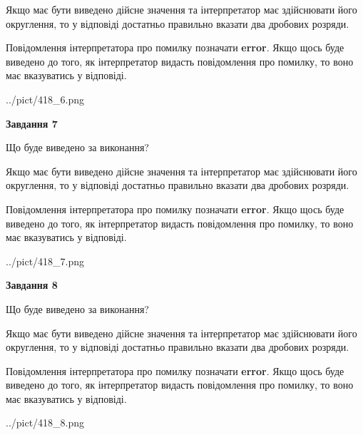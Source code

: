 \documentclass[12pt, ukrainian]{article}
\begin{document}
{\begin {Large}
Якщо має бути виведено дійсне значення та інтерпретатор має здійснювати його округлення, 
то у відповіді достатньо правильно вказати два дробових розряди.

Повідомлення інтерпретатора про помилку позначати \textbf{error}.
Якщо щось буде виведено до того, як інтерпретатор видасть повідомлення про помилку, 
то воно має вказуватись у відповіді. \par

\begin{center}
	{../pict/418_6.png}
\end{center}
\newpage

{\begin {center}\textbf{Завдання 7}\end {center}}\par
Що буде виведено за виконання? \par

Якщо має бути виведено дійсне значення та інтерпретатор має здійснювати його округлення, 
то у відповіді достатньо правильно вказати два дробових розряди.

Повідомлення інтерпретатора про помилку позначати \textbf{error}.
Якщо щось буде виведено до того, як інтерпретатор видасть повідомлення про помилку, 
то воно має вказуватись у відповіді. \par

\begin{center}
	{../pict/418_7.png}
\end{center}
\newpage

{\begin {center}\textbf{Завдання 8}\end {center}}\par
Що буде виведено за виконання? \par

Якщо має бути виведено дійсне значення та інтерпретатор має здійснювати його округлення, 
то у відповіді достатньо правильно вказати два дробових розряди.

Повідомлення інтерпретатора про помилку позначати \textbf{error}.
Якщо щось буде виведено до того, як інтерпретатор видасть повідомлення про помилку, 
то воно має вказуватись у відповіді. \par

\begin{center}
	{../pict/418_8.png}
\end{center}
\newpage


\end{Large}}
\end{document}
